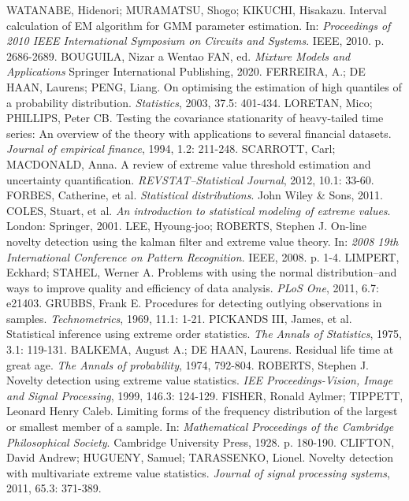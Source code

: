 \documentclass[11pt,twoside,openright]{report}
\begin{document}
\begin{thebibliography}{L}
WATANABE, Hidenori; MURAMATSU, Shogo; KIKUCHI, Hisakazu. Interval calculation of EM algorithm for GMM parameter estimation. In: \textit{Proceedings of 2010 IEEE International Symposium on Circuits and Systems}. IEEE, 2010. p. 2686-2689.
BOUGUILA, Nizar a Wentao FAN, ed. \textit{Mixture Models and Applications} Springer International Publishing, 2020.
FERREIRA, A.; DE HAAN, Laurens; PENG, Liang. On optimising the estimation of high quantiles of a probability distribution. \textit{Statistics}, 2003, 37.5: 401-434.
LORETAN, Mico; PHILLIPS, Peter CB. Testing the covariance stationarity of heavy-tailed time series: An overview of the theory with applications to several financial datasets. \textit{Journal of empirical finance}, 1994, 1.2: 211-248.
SCARROTT, Carl; MACDONALD, Anna. A review of extreme value threshold estimation and uncertainty quantification. \textit{REVSTAT–Statistical Journal}, 2012, 10.1: 33-60.
FORBES, Catherine, et al. \textit{Statistical distributions}. John Wiley \& Sons, 2011.
COLES, Stuart, et al. \textit{An introduction to statistical modeling of extreme values}. London: Springer, 2001.
LEE, Hyoung-joo; ROBERTS, Stephen J. On-line novelty detection using the kalman filter and extreme value theory. In: \textit{2008 19th International Conference on Pattern Recognition}. IEEE, 2008. p. 1-4.
LIMPERT, Eckhard; STAHEL, Werner A. Problems with using the normal distribution–and ways to improve quality and efficiency of data analysis. \textit{PLoS One}, 2011, 6.7: e21403.
GRUBBS, Frank E. Procedures for detecting outlying observations in samples. \textit{Technometrics}, 1969, 11.1: 1-21.
PICKANDS III, James, et al. Statistical inference using extreme order statistics. \textit{The Annals of Statistics}, 1975, 3.1: 119-131.
BALKEMA, August A.; DE HAAN, Laurens. Residual life time at great age. \textit{The Annals of probability}, 1974, 792-804.
ROBERTS, Stephen J. Novelty detection using extreme value statistics. \textit{IEE Proceedings-Vision, Image and Signal Processing}, 1999, 146.3: 124-129.
FISHER, Ronald Aylmer; TIPPETT, Leonard Henry Caleb. Limiting forms of the frequency distribution of the largest or smallest member of a sample. In: \textit{Mathematical Proceedings of the Cambridge Philosophical Society}. Cambridge University Press, 1928. p. 180-190.
CLIFTON, David Andrew; HUGUENY, Samuel; TARASSENKO, Lionel. Novelty detection with multivariate extreme value statistics. \textit{Journal of signal processing systems}, 2011, 65.3: 371-389.

\end{thebibliography}
\end{document}
